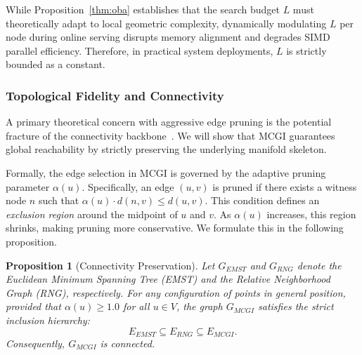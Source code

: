 \documentclass{article}
\theoremstyle{plain}
\newtheorem{proposition}[theorem]{Proposition}
\theoremstyle{definition}
\theoremstyle{remark}
\newcommand{\ours}{MCGI\xspace}
\begin{document}
While Proposition~\ref{thm:oba} establishes that the search budget $L$ must theoretically adapt to local geometric complexity, dynamically modulating $L$ per node during online serving disrupts memory alignment and degrades SIMD parallel efficiency. Therefore, in practical system deployments, $L$ is strictly bounded as a constant. 


\subsubsection{Topological Fidelity and Connectivity}
\label{subsec:connectivity}

A primary theoretical concern with aggressive edge pruning is the potential fracture of the connectivity backbone~\cite{dzhao_pami09}. We will show that \ours{} guarantees global reachability by strictly preserving the underlying manifold skeleton.

Formally, the edge selection in \ours{} is governed by the adaptive pruning parameter $\alpha(u)$. Specifically, an edge $(u, v)$ is pruned if there exists a witness node $n$ such that $\alpha(u) \cdot d(n, v) \le d(u, v)$.
This condition defines an \textit{exclusion region} around the midpoint of $u$ and $v$. As $\alpha(u)$ increases, this region shrinks, making pruning more conservative. We formulate this in the following proposition.

\begin{proposition}[Connectivity Preservation]
\label{prop:connectivity}
Let $G_{EMST}$ and $G_{RNG}$ denote the Euclidean Minimum Spanning Tree (EMST) and the Relative Neighborhood Graph (RNG), respectively. For any configuration of points in general position, provided that $\alpha(u) \ge 1.0$ for all $u \in V$, the graph $G_{MCGI}$ satisfies the strict inclusion hierarchy:
\begin{equation}
    E_{EMST} \subseteq E_{RNG} \subseteq E_{MCGI}.
\end{equation}
Consequently, $G_{MCGI}$ is connected.
\end{proposition}
\end{document}

